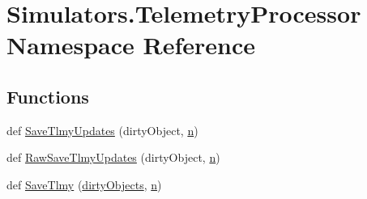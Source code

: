 \hypertarget{namespace_simulators_1_1_telemetry_processor}{}\section{Simulators.\+Telemetry\+Processor Namespace Reference}
\label{namespace_simulators_1_1_telemetry_processor}
\subsection*{Functions}
\begin{DoxyCompactItemize}
\item 
def \hyperlink{namespace_simulators_1_1_telemetry_processor_abaafce9813e342f6c47b481cf02095fd}{Save\+Tlmy\+Updates} (dirty\+Object, \hyperlink{namespace_simulators_1_1_telemetry_processor_adc73b3fce91792369a602ff747603555}{n})
\item 
def \hyperlink{namespace_simulators_1_1_telemetry_processor_a1a2a116f3331f2f0ad2765ed544d020b}{Raw\+Save\+Tlmy\+Updates} (dirty\+Object, \hyperlink{namespace_simulators_1_1_telemetry_processor_adc73b3fce91792369a602ff747603555}{n})
\item 
def \hyperlink{namespace_simulators_1_1_telemetry_processor_ad9e1575da9b3c1f3fde7e7cc688995d8}{Save\+Tlmy} (\hyperlink{namespace_simulators_1_1_telemetry_processor_aa425ba047b0408bf6e05f599222c6bee}{dirty\+Objects}, \hyperlink{namespace_simulators_1_1_telemetry_processor_adc73b3fce91792369a602ff747603555}{n})
\end{DoxyCompactItemize}
